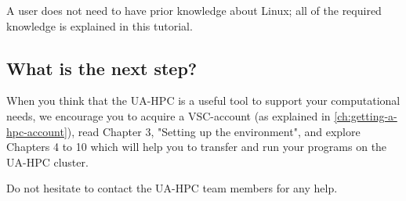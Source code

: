 A user does not need to have prior knowledge about Linux; all of the required
knowledge is explained in this tutorial.

\subsection{What is the next step?}

When you think that the UA-HPC is a useful tool to support your computational
needs, we encourage you to acquire a VSC-account (as explained in
\autoref{ch:getting-a-hpc-account}), read Chapter 3, "Setting up the
environment", and explore Chapters 4 to 10 which will help you to transfer and
run your programs on the UA-HPC cluster.

Do not hesitate to contact the UA-HPC team members for any help.
